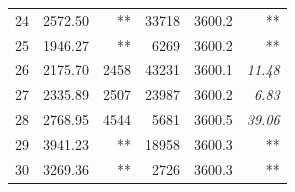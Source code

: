 \documentclass[11pt]{article}
\theoremstyle{plain}%
\theoremstyle{definition} \newtheorem{lem}{Lemma}[section]
\theoremstyle{definition} \newtheorem{claim}{Claim}[lem]
\theoremstyle{definition} \newtheorem{theorem}{Theorem}[section]
\theoremstyle{definition} \newtheorem{exo}{Exercice n$^\circ$}
\theoremstyle{definition} \newtheorem{quest}{}[exo]
\theoremstyle{definition} \newtheorem{sousquest}{}[quest]
\theoremstyle{remark}
\theoremstyle{definition}
\begin{document}
\begin{table}[H]
\begin{tabular}{|r|rrrrr|}
    24     & 2572.50 & **    & 33718 & 3600.2 & ** \\
    25    & 1946.27 & **   & 6269  & 3600.2 & ** \\
    26    &  2175.70 & 2458  & 43231 & 3600.1 & {\it 11.48} \\
    27    & 2335.89 & 2507  &  23987 & 3600.2 & {\it 6.83} \\
    28    &2768.95 & 4544  & 5681  & 3600.5 & {\it 39.06} \\
    29    & 3941.23 & **    &18958 & 3600.3 & ** \\
   30    & 3269.36 & **    & 2726  & 3600.3 & ** \\
    \bottomrule
    \end{tabular}%
  \label{tab:ChSymStc}%
\end{table}%
\end{document}
